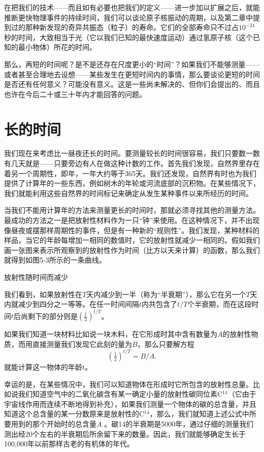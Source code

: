 \documentclass[12pt,oneside]{book}
\begin{document}
\begin{common-format}
在把我们的技术——而且如有必要也把我们的定义——进一步加以扩展之后，就能推断更快物理事件的持续时间，我们可以谈论原子核振动的周期，以及第二章中提到过的那种新发现的奇异共振态（粒子）的寿命。它们的全部寿命只不过占$ 10^{-24} $秒的时间，大致相当于光（它以我们已知的最快速度运动）通过氢原子核（这个已知的最小物体）所花的时间。

那么，再短的时间呢？是不是还存在尺度更小的“时间”？如果我们不能够测量——或者甚至合理地去设想——某些发生在更短时间内的事情，那么要谈论更短的时间是否还有任何意义？可能没有意义。这是一些尚未解决的、但你们会提出的、而且也许在今后二十或三十年内才能回答的问题。


\section{长的时间}
我们现在来考虑比一昼夜还长的时间。要测量较长的时间很容易，我们只要数一数有几天就是——只要旁边有人在做这种计数的工作。首先我们发现，自然界里存在着另一个周期性，即年，一年大约等于365天。我们还发现，自然界有时也为我们提供了计算年的一些东西，例如树木的年轮或河流底部的沉积物。在某些情况下，我们就能利用这些自然界的时间标记来确定从发生某种事件以来所经历的时间。

当我们不能用计算年的方法来测量更长的时间时，那就必须寻找其他的测量方法。最成功的方法之一是把放射性材料作为一只“钟”来使用。在这种情况下，并不出现像昼夜或摆那样周期性的事件，但是有一种新的“规则性”。我们发现，某种材料的样品，当它的年龄每增加一相同的数值时，它的放射性就减少一相同的。假如我们画一张图来表示所观察到的放射性作为时间（比方以天来计算）的函数，那么我们就得到如图5-3所示的一条曲线。
\begin{fig}{放射性随时间而减少}
\caption{\footnotesize 放射性随时间而减少。在每一个“半衰期”$ T $中，放射性都减少一半}
\label{fig:放射性随时间而减少}
\end{fig}
我们看到，如果放射性在$ T $天内减少到一半（称为“半衰期”），那么它在另一个$ T $天内就减少到四分之一等等。在任一时间间隔$ t $内共包含了$ t/T $个半衰期，而在这段时间$ t $后尚剩下的部分则是$ (\tfrac{1}{2})^{t/T} $。

如果我们知道一块材料比如说一块木料，在它形成时其中含有数量为$ A $的放射性物质，而用直接测量我们发现它此刻的量为$ B $，那么只要解方程
\begin{equation*}
(\tfrac{1}{2})^{t/T}=B/A.
\end{equation*}
就能计算这一物体的年龄$ t $。

幸运的是，在某些情况中，我们可以知道物体在形成时它所包含的放射性总量。比如说我们知道空气中的二氧化碳含有某一确定小量的放射性碳同位素C$ ^{14} $（它由于宇宙线作用而连续不断地得到补充），如果我们测量一个物体的碳的总含量，并且知道这个总含量的某一分数原来是放射性的C$ ^{14} $，那么，我们就知道上述公式中所要用到的那个开始时的总含量$ A $ 。碳14的半衰期是5000年，通过仔细的测量我们测出经20个左右的半衰期后所余留下来的数量。因此，我们就能够确定生长于100,000年以前那样古老的有机体的年代。


\end{common-format}
\end{document}

